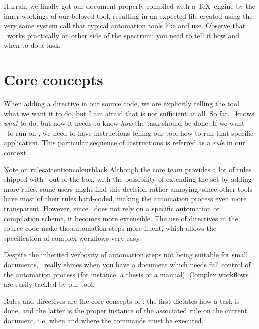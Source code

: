 Hurrah, we finally got our document properly compiled with a \TeX\ engine by the inner workings of our beloved tool, resulting in an expected  file created using the very same system call that typical automation tools like  and  use. Observe that \arara\ works practically on other side of the spectrum: you need to tell it how and when to do a task.

\section{Core concepts}
\label{sec:coreconcepts}

When adding a directive in our source code, we are explicitly telling the tool what we want it to do, but I am afraid that is not sufficient at all. So far, \arara\ knows \emph{what} to do, but now it needs to know \emph{how} the task should be done. If we want \arara\ to run  on , we need to have instructions telling our tool how to run that specific application. This particular sequence of instructions is referred as a \emph{rule} in our context. 

\begin{messagebox}{Note on rules}{attentioncolour}{\icattention}{black}
Although the core team provides a lot of rules shipped with \arara\ out of the box, with the possibility of extending the set by adding more rules, some users might find this decision rather annoying, since other tools have most of their rules hard-coded, making the automation process even more transparent. However, since \arara\ does not rely on a specific automation or compilation scheme, it becomes more extensible. The use of directives in the source code make the automation steps more fluent, which allows the specification of complex workflows very easy.
\end{messagebox}

Despite the inherited verbosity of automation steps not being suitable for small documents, \arara\ really shines when you have a document which needs full control of the automation process (for instance, a thesis or a manual). Complex workflows are easily tackled by our tool.

Rules and directives are the core concepts of \arara: the first dictates how a task is done, and the latter is the proper instance of the associated rule on the current document, i.e, when and where the commands must be executed.

